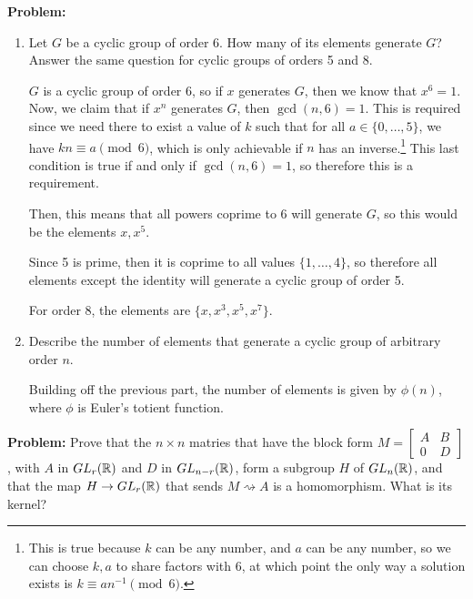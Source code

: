 \documentclass[10pt]{article}
\newenvironment{problem}{\textbf{Problem:}}{}
\begin{document}
\begin{problem}
	\begin{enumerate}[label=\alph*)]
		\item Let \( G \) be a cyclic group of order 6. How many of its elements 
			generate \( G \)? Answer the same question for cyclic groups of orders 
			5 and 8. 

			\begin{solution}
				\( G \) is a cyclic group of order 6, so if \( x \) generates
				 \( G \), then we know that \( x^{6} = 1 \). Now, we claim that 
				 if \( x^{n} \) generates \( G \), then \( \gcd(n, 6) = 1 \). This 
				 is required since we need there to exist a value of \( k \) such that 
				 for all \( a \in \{0, \dots, 5\}  \), we have
				 \( kn \equiv a \pmod 6 \), which is only achievable if 
				 \( n \) has an inverse.\footnote{
					 This is true because \( k \) can be any number, and \( a \) can be 
					 any number, so we can choose \( k, a \) to share factors with 6,
					 at which point the only way a solution exists is 
				 \( k \equiv a n^{-1} \pmod 6 \).}
				 This last condition is true if and only 
				 if \( \gcd(n, 6) = 1 \), so therefore this is a requirement. 
				
				 Then, this means that all powers coprime to 6 will generate \( G \), 
				 so this would be the elements \( x, x^{5} \).  

				 Since 5 is prime, then it is coprime to all values 
				 \( \{1, \dots, 4\}  \), so therefore all elements except the identity
				 will generate a cyclic group of order 5. 

				 For order 8, the elements are \( \{x, x^3, x^{5}, x^{7}\}  \). 
			\end{solution}
		\item Describe the number of elements that generate a cyclic group of 
			arbitrary order \( n \). 

			\begin{solution}
				Building off the previous part, the number of elements is 
				given by \( \phi(n) \), where \( \phi \) is Euler's totient function. 
			\end{solution}
	\end{enumerate}
\end{problem}


\begin{problem}
	Prove that the \( n \times n \) matries that have the block form 
	\( M = \begin{bmatrix} A & B \\ 0 & D  \end{bmatrix} \), with 
	\( A \) in \( GL_r(\mathbb R) \) and \( D \) in \( GL_{n - r}(\mathbb R) \), form a subgroup 
	\( H \) of \( GL_n(\mathbb R) \), and that the map \( H \to GL_r(\mathbb R)\) that 
	sends \( M \rightsquigarrow  A \) is a homomorphism. What is its kernel?
\end{problem}
\end{document}
